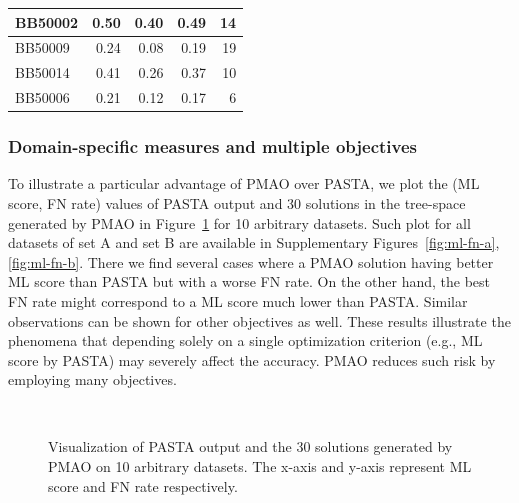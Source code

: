 \begin{table}[!htbp]
\begin{tabular}{|l|r|r|r||r|}
		\hline
		BB50002 & \cellcolor[rgb]{ .988,  1,  .992}0.50 & \cellcolor[rgb]{ .384,  .745,  .478}0.40 & \cellcolor[rgb]{ .941,  .98,  .953}0.49 & \cellcolor[rgb]{ .984,  .733,  .741}14 \\
		\hline
		BB50009 & \cellcolor[rgb]{ .988,  1,  .992}0.24 & \cellcolor[rgb]{ .384,  .745,  .478}0.08 & \cellcolor[rgb]{ .788,  .914,  .82}0.19 & \cellcolor[rgb]{ .98,  .631,  .643}19 \\
		\hline
		BB50014 & \cellcolor[rgb]{ .988,  1,  .992}0.41 & \cellcolor[rgb]{ .384,  .745,  .478}0.26 & \cellcolor[rgb]{ .835,  .933,  .863}0.37 & \cellcolor[rgb]{ .984,  .812,  .824}10 \\
		\hline
		BB50006 & \cellcolor[rgb]{ .988,  1,  .992}0.21 & \cellcolor[rgb]{ .384,  .745,  .478}0.12 & \cellcolor[rgb]{ .725,  .886,  .769}0.17 & \cellcolor[rgb]{ .988,  .89,  .902}6 \\
		\hline
	\end{tabular}%
	\label{tab:pmao-pasta-b}%
\end{table}%

\subsubsection{Domain-specific measures and multiple objectives}
To illustrate a particular advantage of PMAO over PASTA, we plot the (ML score, FN rate) values of PASTA output and 30 solutions in the tree-space generated by PMAO in Figure~\ref{fig:ml-fn} for 10 arbitrary datasets. Such plot for all datasets of set A and set B are available in Supplementary Figures~\ref{fig:ml-fn-a}, \ref{fig:ml-fn-b}. There we find several cases where a PMAO solution having better ML score than PASTA but with a worse FN rate.  On the other hand, the best FN rate might correspond to a ML score much lower than PASTA. Similar observations can be shown for other objectives as well. These results illustrate the phenomena that depending solely on a single optimization criterion (e.g., ML score by PASTA) may severely affect the accuracy. PMAO reduces such risk by employing many objectives.

\begin{figure}[!htbp]%
	\begin{adjustwidth}{-1cm}{}
		\centering
		\\%
	\end{adjustwidth}
	\caption{Visualization of PASTA output and the 30 solutions generated by PMAO on 10 arbitrary datasets. The x-axis and y-axis represent ML score and FN rate respectively.}
	\label{fig:ml-fn}
\end{figure}

